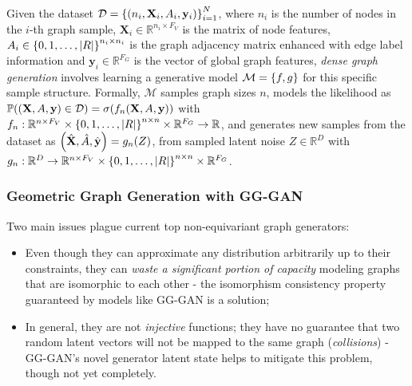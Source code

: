 \begin{definition}
Given the dataset $\mathcal{D}=\mathopen{}\left\{\mathopen{}\left(n_i,\mathbf{X}_i,A_i,\mathbf{y}_i\right)\right\}_{i=1}^{N}$, where $n_i$ is the number of nodes in the $i$-th graph sample, $\mathbf{X}_i \in \mathbb{R}^{n_i \times F_V}$ is the matrix of node features, $A_i \in \mathopen{}\left\{0,1,\dots,\mathopen{}\left|R\right|\right\}^{n_i \times n_i}$ is the graph adjacency matrix enhanced with edge label information and $\mathbf{y}_i \in \mathbb{R}^{F_G}$ is the vector of global graph features, \emph{dense graph generation} involves learning a generative model $\mathcal{M}=\mathopen{}\left\{f,g\right\}$ for this specific sample structure. Formally, $\mathcal{M}$ samples graph sizes $n$, models the likelihood as $\mathbb{P}\mathopen{}\left(\mathopen{}\left(\mathbf{X},A,\mathbf{y}\right) \in \mathcal{D}\right)=\sigma\mathopen{}\left(f_n\mathopen{}\left(\mathbf{X},A,\mathbf{y}\right)\right)$ with $f_n: \mathbb{R}^{n \times F_V} \times \mathopen{}\left\{0,1,\dots,\mathopen{}\left|R\right|\right\}^{n \times n} \times \mathbb{R}^{F_G} \to \mathbb{R}$, and generates new samples from the dataset as $\mathopen{}\left(\hat{\mathbf{X}},\hat{A},\hat{\mathbf{y}}\right)=g_n\mathopen{}\left(Z\right)$, from sampled latent noise $Z\in\mathbb{R}^D$ with $g_n:\mathbb{R}^D \to \mathbb{R}^{n \times F_V} \times \mathopen{}\left\{0,1,\dots,\mathopen{}\left|R\right|\right\}^{n \times n} \times \mathbb{R}^{F_G}$.
\end{definition}

\subsubsection{Geometric Graph Generation with GG-GAN}
Two main issues plague current top non-equivariant graph generators: 
\begin{itemize}
\item Even though they can approximate any distribution arbitrarily up to their constraints, they can \emph{waste a significant portion of capacity} modeling graphs that are isomorphic to each other - the isomorphism consistency property guaranteed by models like GG-GAN is a solution;
\item In general, they are not \emph{injective} functions; they have no guarantee that two random latent vectors will not be mapped to the same graph (\emph{collisions}) - GG-GAN's novel generator latent state helps to mitigate this problem, though not yet completely.  
\end{itemize}

